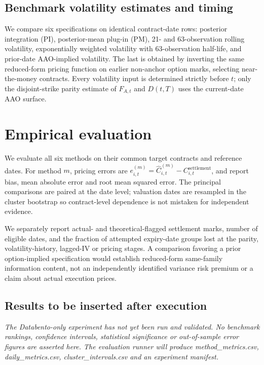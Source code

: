 \documentclass[a4paper,fleqn]{cas-dc}
\begin{document}
\subsection{Benchmark volatility estimates and timing}

We compare six specifications on identical contract-date rows:
posterior integration (PI), posterior-mean plug-in (PM),
21- and 63-observation rolling volatility, exponentially weighted
volatility with 63-observation half-life, and prior-date
AAO-implied volatility. The last is obtained by inverting the
same reduced-form pricing function on earlier non-anchor
option marks, selecting near-the-money contracts.
Every volatility input is determined strictly before $t$;
only the disjoint-strike parity estimate of $F_{A,t}$ and
$D(t,T)$ uses the current-date AAO surface.

\section{Empirical evaluation}
\label{sec:db_results}

We evaluate all six methods on their common target contracts
and reference dates. For method $m$, pricing errors are
$e_{i,t}^{(m)}=\widehat C_{i,t}^{(m)}-C_{i,t}^{\mathrm{settlement}}$,
and report bias, mean absolute error and root mean squared error.
The principal comparisons are paired at the date level;
valuation dates are resampled in the cluster bootstrap so
contract-level dependence is not mistaken for independent evidence.

We separately report actual- and theoretical-flagged settlement
marks, number of eligible dates, and the fraction of attempted
expiry-date groups lost at the parity, volatility-history,
lagged-IV or pricing stages. A comparison favoring a prior
option-implied specification would establish reduced-form
same-family information content, not an independently identified
variance risk premium or a claim about actual execution prices.

\subsection{Results to be inserted after execution}

\textit{The Databento-only experiment has not yet been run and validated.
No benchmark rankings, confidence intervals, statistical significance
or out-of-sample error figures are asserted here. The evaluation
runner will produce method\_metrics.csv, daily\_metrics.csv,
cluster\_intervals.csv and an experiment manifest.}
\end{document}
